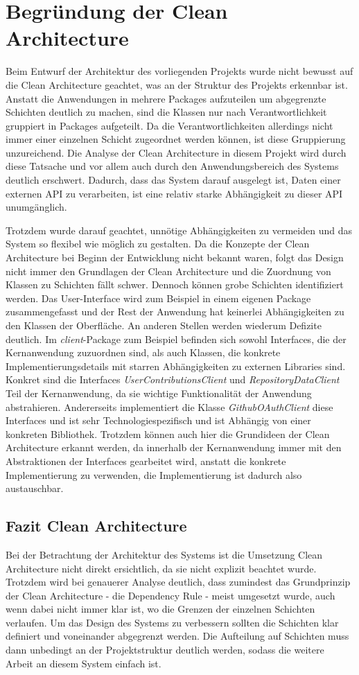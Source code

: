 \section{Begründung der Clean Architecture}
Beim Entwurf der Architektur des vorliegenden Projekts wurde nicht bewusst auf die Clean Architecture geachtet, was an der Struktur des Projekts erkennbar ist.
Anstatt die Anwendungen in mehrere Packages aufzuteilen um abgegrenzte Schichten deutlich zu machen, sind die Klassen nur nach Verantwortlichkeit gruppiert in Packages aufgeteilt.
Da die Verantwortlichkeiten allerdings nicht immer einer einzelnen Schicht zugeordnet werden können, ist diese Gruppierung unzureichend.
Die Analyse der Clean Architecture in diesem Projekt wird durch diese Tatsache und vor allem auch durch den Anwendungsbereich des Systems deutlich erschwert.
Dadurch, dass das System darauf ausgelegt ist, Daten einer externen API zu verarbeiten, ist eine relativ starke Abhängigkeit zu dieser API unumgänglich.

Trotzdem wurde darauf geachtet, unnötige Abhängigkeiten zu vermeiden und das System so flexibel wie möglich zu gestalten.
Da die Konzepte der Clean Architecture bei Beginn der Entwicklung nicht bekannt waren, folgt das Design nicht immer den Grundlagen der Clean Architecture und die Zuordnung von Klassen zu Schichten fällt schwer.
Dennoch können grobe Schichten identifiziert werden.
Das User-Interface wird zum Beispiel in einem eigenen Package zusammengefasst und der Rest der Anwendung hat keinerlei Abhängigkeiten zu den Klassen der Oberfläche.
An anderen Stellen werden wiederum Defizite deutlich.
Im \textit{client}-Package zum Beispiel befinden sich sowohl Interfaces, die der Kernanwendung zuzuordnen sind, als auch Klassen, die konkrete Implementierungsdetails mit starren Abhängigkeiten zu externen Libraries sind.
Konkret sind die Interfaces \textit{UserContributionsClient} und \textit{RepositoryDataClient} Teil der Kernanwendung, da sie wichtige Funktionalität der Anwendung abstrahieren.
Andererseits implementiert die Klasse \textit{GithubOAuthClient} diese Interfaces und ist sehr Technologiespezifisch und ist Abhängig von einer konkreten Bibliothek.
Trotzdem können auch hier die Grundideen der Clean Architecture erkannt werden, da innerhalb der Kernanwendung immer mit den Abstraktionen der Interfaces gearbeitet wird, anstatt die konkrete Implementierung zu verwenden, die Implementierung ist dadurch also austauschbar.

\subsection{Fazit Clean Architecture}
Bei der Betrachtung der Architektur des Systems ist die Umsetzung Clean Architecture nicht direkt ersichtlich, da sie nicht explizit beachtet wurde.
Trotzdem wird bei genauerer Analyse deutlich, dass zumindest das Grundprinzip der Clean Architecture - die Dependency Rule - meist umgesetzt wurde, auch wenn dabei nicht immer klar ist, wo die Grenzen der einzelnen Schichten verlaufen.
Um das Design des Systems zu verbessern sollten die Schichten klar definiert und voneinander abgegrenzt werden.
Die Aufteilung auf Schichten muss dann unbedingt an der Projektstruktur deutlich werden, sodass die weitere Arbeit an diesem System einfach ist.
